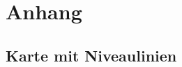 \cleardoubleoddemptypage
{}
\setcounter{page}{1}
\appendix
\chapter{Anhang} %
\label{cha:anhang}
\section{Karte mit Niveaulinien} %
\label{sec:karte_niveau}

\printindex
\listoffigures
\printbibliography
\todototoc
{}
